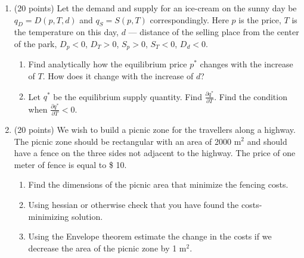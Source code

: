 \documentclass[12pt]{article} %
\theoremstyle{definition} %
\begin{document}
\begin{enumerate}[resume]

  \item (20 points) Let the demand and supply for an ice-cream on the sunny day be $q_D=D(p, T, d)$ 
  and $q_S=S(p,T)$ correspondingly. Here $p$ is the price, 
  $T$ is the temperature on this day, $d$ — distance of the selling place from the center of the park, 
  $D_p<0$, $D_T>0$, $S_p>0$, $S_T<0$, $D_d<0$. 

  \begin{enumerate}
  \item Find analytically how the equilibrium price $p^{\ast}$ changes with the increase of $T$. 
  How does it change with the increase of $d$? 
  \item Let $q^{\ast}$ be the equilibrium supply quantity. 
  Find $\frac{\partial{q^{\ast}}}{\partial T}$. 
  Find the condition when $\frac{\partial{q^{\ast}}}{\partial T}<0$.
  \end{enumerate}
    
  
\item (20 points) We wish to build a picnic zone for the travellers along a highway. The picnic zone should be rectangular 
with an area of 2000 m$^2$ and should have a fence on the three sides not adjacent to the highway. 
The price of one meter of fence is equal to \$ 10.
\begin{enumerate}
\item Find the dimensions of the picnic area that minimize the fencing costs.
\item Using hessian or otherwise check that you have found the costs-minimizing solution.
\item Using the Envelope theorem estimate the change in the costs if we decrease the area of the picnic zone by 1 m$^2$.
\end{enumerate}
\end{enumerate}
\end{document}
